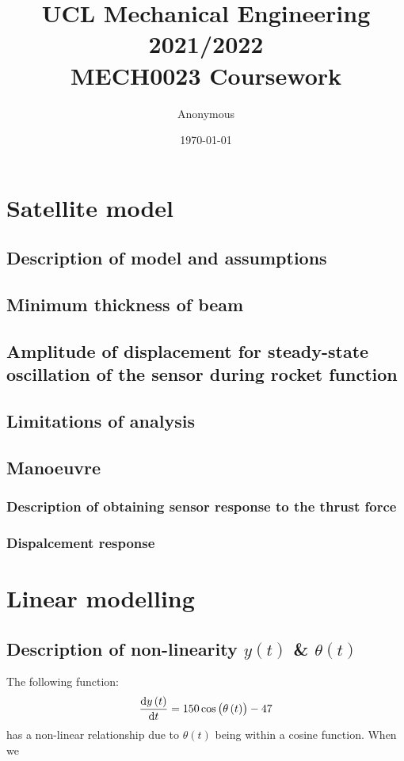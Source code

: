 \documentclass[11pt]{article}
\numberwithin{equation}{section}
\begin{document}
\title{\textbf{UCL Mechanical Engineering 2021/2022}\\MECH0023 Coursework}
\author{Anonymous}
\date{\today}
\maketitle
\tableofcontents
\listoffigures
\section{Satellite model}
\subsection{Description of model and assumptions}
\subsection{Minimum thickness of beam}
\subsection{Amplitude of displacement for steady-state oscillation of the sensor during rocket function}
\subsection{Limitations of analysis}
\subsection{Manoeuvre}
\subsubsection{Description of obtaining sensor response to the thrust force}
\subsubsection{Dispalcement response}
\section{Linear modelling}
\subsection{Description of non-linearity $y(t)$ \& $\theta(t)$}
The following function:
\begin{equation}
    \frac{\dif y\left( t\right)}{\dif t} = 150 \cos \left(\theta\left(t\right)\right) - 47
\end{equation}
has a non-linear relationship due to $\theta(t)$ being within a cosine function. When we
\end{document}
